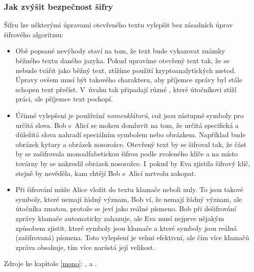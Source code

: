 \documentclass[12pt]{article}
\theoremstyle{definition}
\begin{document}
\subsubsection{Jak zvýšit bezpečnost šifry}
Šifru lze některými úpravami otevřeného textu vylepšit bez zásadních úprav šifrového algoritmu:

\begin{itemize}
\item Obě popsané nevýhody staví na tom, že text bude vykazovat známky běžného textu daného jazyka. Pokud upravíme otevřený text tak, že se nebude tvářit jako běžný text, ztížíme použití kryptoanalytických metod. Úpravy ovšem musí být takového charakteru, aby příjemce zprávy byl stále schopen text přečíst. V~úvahu tak připadají různé , které útočníkovi ztíží práci, ale příjemce text pochopí. 
\item Účinné vylepšení je používání {\em nomenklátorů}, což jsou zástupné symboly pro určitá slova. Bob s~Alicí se mohou domluvit na tom, že určitá specifická a důležitá slova nahradí speciálním symbolem nebo obrázkem. Například  bude obrázek kytary a  obrázek nosorožce. Otevřený text  by se šifroval tak, že část  by se zašifrovala monoalfabetickou šifrou podle zvoleného klíče a na místo továrny by se nakreslil obrázek nosorožce. I~pokud by Eva zjistila šifrový klíč, stejně by nevěděla, kam chtějí Bob s~Alicí mrtvolu zakopat. 
\item Při šifrování může Alice vložit do textu klamače neboli nuly. To jsou takové symboly, které nemají žádný význam, Bob ví, že nemají žádný význam, ale útočníka zmatou, protože se jeví jako reálné písmeno. Bob při dešifrování zprávy klamače automaticky zahazuje, ale Eva musí nejprve nějakým způsobem zjistit, které symboly jsou klamače a které symboly jsou reálná (zašifrovaná) písmena. Toto vylepšení je velmi efektivní, ale čím více klamačů zpráva obsahuje, tím více narůstá její velikost.
\end{itemize}

Zdroje ke kapitole \ref{mono}: \cite{chip}, \cite{singh} a \cite{mono}.







\end{document}
